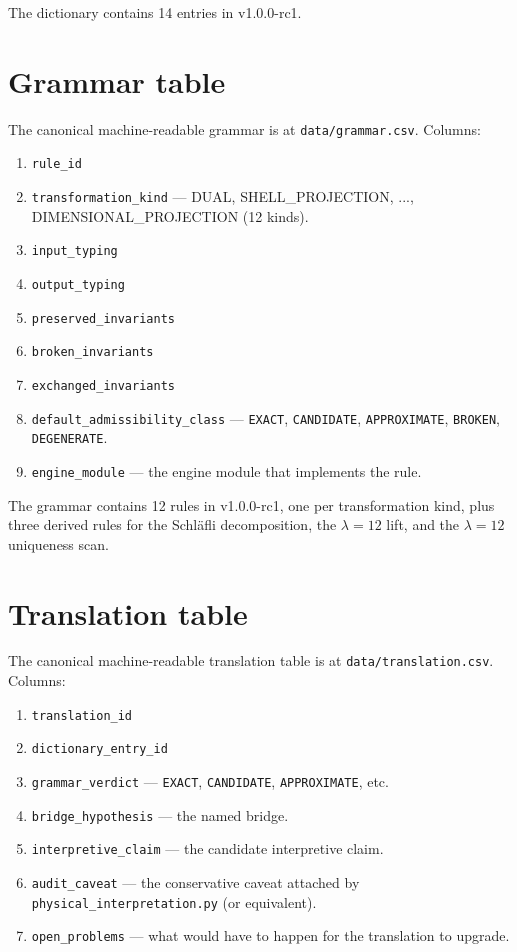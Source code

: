 \documentclass[11pt,a4paper]{article}
\begin{document}
The dictionary contains 14 entries in v1.0.0-rc1.

\section{Grammar table}
\label{app:grammar}

The canonical machine-readable grammar is at
\texttt{data/grammar.csv}. Columns:

\begin{enumerate}[leftmargin=*]
  \item \texttt{rule\_id}
  \item \texttt{transformation\_kind} --- DUAL,
        SHELL\_PROJECTION, ..., DIMENSIONAL\_PROJECTION (12 kinds).
  \item \texttt{input\_typing}
  \item \texttt{output\_typing}
  \item \texttt{preserved\_invariants}
  \item \texttt{broken\_invariants}
  \item \texttt{exchanged\_invariants}
  \item \texttt{default\_admissibility\_class} --- \texttt{EXACT},
        \texttt{CANDIDATE}, \texttt{APPROXIMATE}, \texttt{BROKEN},
        \texttt{DEGENERATE}.
  \item \texttt{engine\_module} --- the engine module that
        implements the rule.
\end{enumerate}

The grammar contains 12 rules in v1.0.0-rc1, one per
transformation kind, plus three derived rules for the Schl\"afli
decomposition, the $\lambda = 12$ lift, and the $\lambda = 12$
uniqueness scan.

\section{Translation table}
\label{app:translation}

The canonical machine-readable translation table is at
\texttt{data/translation.csv}. Columns:

\begin{enumerate}[leftmargin=*]
  \item \texttt{translation\_id}
  \item \texttt{dictionary\_entry\_id}
  \item \texttt{grammar\_verdict} --- \texttt{EXACT},
        \texttt{CANDIDATE}, \texttt{APPROXIMATE}, etc.
  \item \texttt{bridge\_hypothesis} --- the named bridge.
  \item \texttt{interpretive\_claim} --- the candidate
        interpretive claim.
  \item \texttt{audit\_caveat} --- the conservative caveat
        attached by \texttt{physical\_interpretation.py} (or
        equivalent).
  \item \texttt{open\_problems} --- what would have to happen for
        the translation to upgrade.
\end{enumerate}
\end{document}
